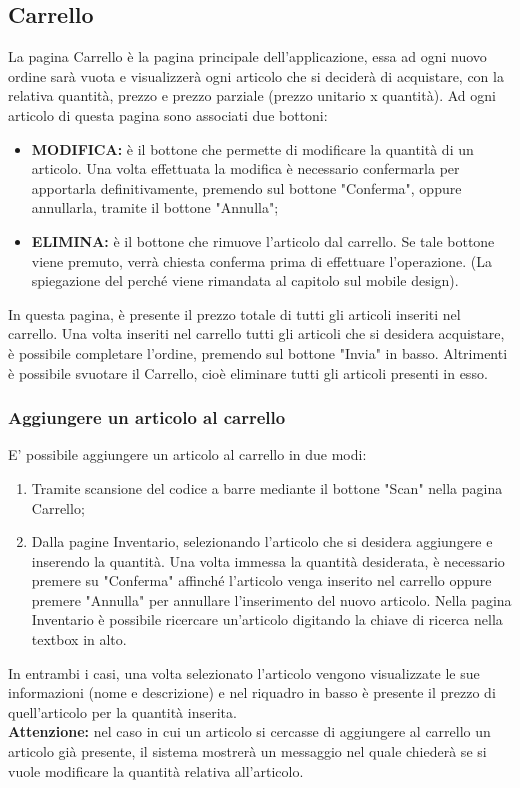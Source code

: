 \documentclass[12pt, a4paper, titlepage]{report}
\begin{document}
	\subsection{Carrello}
	La pagina Carrello è la pagina principale dell'applicazione, essa ad ogni nuovo ordine sarà vuota e visualizzerà ogni articolo che si deciderà di acquistare, con la relativa quantità, prezzo e prezzo parziale (prezzo unitario x quantità). Ad ogni articolo di questa pagina sono associati due bottoni: 
	\begin{itemize}
		\item \textbf{MODIFICA:} è il bottone che permette di modificare la quantità di un articolo. Una volta effettuata la modifica è necessario confermarla per apportarla definitivamente, premendo sul bottone "Conferma", oppure annullarla, tramite il bottone "Annulla";
		\item \textbf{ELIMINA:} è il bottone che rimuove l'articolo dal carrello. Se tale bottone viene premuto, verrà chiesta conferma prima di effettuare l'operazione. (La spiegazione del perché viene rimandata al capitolo sul mobile design).
	\end{itemize}
	In questa pagina, è presente il prezzo totale di tutti gli articoli inseriti nel carrello.
	Una volta inseriti nel carrello tutti gli articoli che si desidera acquistare, è possibile completare l'ordine, premendo sul bottone "Invia" in basso. Altrimenti è possibile svuotare il Carrello, cioè eliminare tutti gli articoli presenti in esso.
	
	\subsubsection{Aggiungere un articolo al carrello}
	E' possibile aggiungere un articolo al carrello in due modi: 
	\begin{enumerate}
		\item Tramite scansione del codice a barre mediante il bottone "Scan" nella pagina Carrello;
		\item Dalla pagine Inventario, selezionando l'articolo che si desidera aggiungere e inserendo la quantità. Una volta immessa la quantità desiderata, è necessario premere su "Conferma" affinché l'articolo venga inserito nel carrello oppure premere "Annulla" per annullare l'inserimento del nuovo articolo. Nella pagina Inventario è possibile ricercare un'articolo digitando la chiave di ricerca nella textbox in alto.
	\end{enumerate}
	In entrambi i casi, una volta selezionato l'articolo vengono visualizzate le sue informazioni (nome e descrizione) e nel riquadro in basso è presente il prezzo di quell'articolo per la quantità inserita.
	\\ \textbf{Attenzione:} nel caso in cui un articolo si cercasse di aggiungere al carrello un articolo già presente, il sistema mostrerà un messaggio nel quale chiederà se si vuole modificare la quantità relativa all'articolo.
	
\end{document}
